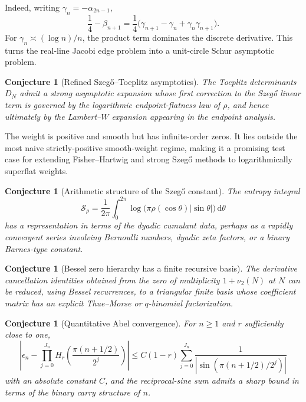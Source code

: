 \documentclass[11pt,oneside]{article}
\newtheorem{conjecture}[theorem]{Conjecture}
\theoremstyle{definition}
\newcommand{\dd}{\,\mathrm d}
\newcommand{\vTwo}{\nu_2}
\begin{document}
Indeed, writing \(\gamma_n=-\alpha_{2n-1}\),
\[
 \frac14-\beta_{n+1}
 =\frac14\bigl(\gamma_{n+1}-\gamma_n+\gamma_n\gamma_{n+1}\bigr).
\]
For \(\gamma_n\asymp(\log n)/n\), the product term dominates the discrete derivative.
This turns the real-line Jacobi edge problem into a unit-circle Schur asymptotic problem.

\begin{conjecture}[Refined Szeg\H{o}--Toeplitz asymptotics]
\label{conj:Toeplitz}
The Toeplitz determinants \(D_N\) admit a strong asymptotic expansion whose first correction
to the Szeg\H{o} linear term is governed by the logarithmic endpoint-flatness law of
\(\rho\), and hence ultimately by the Lambert--\(W\) expansion appearing in the endpoint
analysis.
\end{conjecture}

The weight is positive and smooth but has infinite-order zeros. It lies outside the most
naive strictly-positive smooth-weight regime, making it a promising test case for extending
Fisher--Hartwig and strong Szeg\H{o} methods to logarithmically superflat weights.

\begin{conjecture}[Arithmetic structure of the Szeg\H{o} constant]
\label{conj:Szego-constant}
The entropy integral
\begin{equation}
 \mathcal S_\rho=\frac1{2\pi}\int_0^{2\pi}
 \log\bigl(\pi\rho(\cos\theta)|\sin\theta|\bigr)\dd\theta
 \label{eq:Szego-constant}
\end{equation}
has a representation in terms of the dyadic cumulant data, perhaps as a rapidly convergent
series involving Bernoulli numbers, dyadic zeta factors, or a binary Barnes-type constant.
\end{conjecture}

\begin{conjecture}[Bessel zero hierarchy has a finite recursive basis]
\label{conj:Bessel-basis}
The derivative cancellation identities obtained from the zero of multiplicity
\(1+\vTwo(N)\) at \(N\) can be reduced, using Bessel recurrences, to a triangular finite
basis whose coefficient matrix has an explicit Thue--Morse or \(q\)-binomial factorization.
\end{conjecture}

\begin{conjecture}[Quantitative Abel convergence]
\label{conj:Abel-rate}
For \(n\ge1\) and \(r\) sufficiently close to one,
\begin{equation}
 \left|\epsilon_n-\prod_{j=0}^{J_n}H_r\!\left(
 \frac{\pi(n+1/2)}{2^j}\right)\right|
 \le C(1-r)\sum_{j=0}^{J_n}\frac{1}{|\sin(\pi(n+1/2)/2^j)|}
 \label{eq:Abel-rate}
\end{equation}
with an absolute constant \(C\), and the reciprocal-sine sum admits a sharp bound in terms
of the binary carry structure of \(n\).
\end{conjecture}
\end{document}
